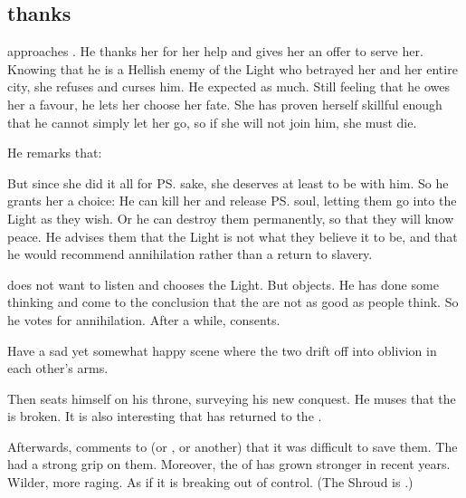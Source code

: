 \begin{garbage}
\subsection[Psyrex thanks Tiroco]{\Psyrex{} thanks \Tiroco}
\Psyrex{} approaches \Tiroco{}. He thanks her for her help and gives her an offer to serve her. Knowing that he is a Hellish enemy of the Light who betrayed her and her entire city, she refuses and curses him. He expected as much. Still feeling that he owes her a favour, he lets her choose her fate. She has proven herself skillful enough that he cannot simply let her go, so if she will not join him, she must die. %

He remarks that: 

But since she did it all for \ps{\Icor} sake, she deserves at least to be with him. So he grants her a choice: He can kill her and release \ps{\Icor} soul, letting them go into the Light as they wish. Or he can destroy them permanently, so that they will know peace. He advises them that the Light is not what they believe it to be, and that he would recommend annihilation rather than a return to slavery. 

\Tiroco{} does not want to listen and chooses the Light. But \Icor{} objects. He has done some thinking and come to the conclusion that the \Sephiroth{} are not as good as people think. So he votes for annihilation. After a while, \Tiroco{} consents. 

Have a sad yet somewhat happy scene where the two drift off into oblivion in each other's arms. 

Then \Psyrex{} seats himself on his throne, surveying his new conquest. He muses that the \charade{} is broken. It is also interesting that \Ishnaruchaefir{} has returned to the \secretwar. 

Afterwards, \Psyrex{} comments to \Secherdamon{} (or \Nzessuacrith, or another) that it was difficult to save them. 
The \sephiroth{} had a strong grip on them. 
Moreover, the  of \Iquin{} has grown stronger in recent years. 
Wilder, more raging. 
As if it is breaking out of control. 
(The Shroud is .) 


\end{garbage}
